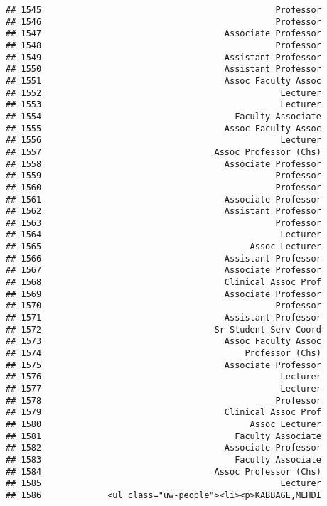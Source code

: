 \documentclass[
]{article}
\begin{document}
\begin{verbatim}
## 1545                                              Professor
## 1546                                              Professor
## 1547                                    Associate Professor
## 1548                                              Professor
## 1549                                    Assistant Professor
## 1550                                    Assistant Professor
## 1551                                    Assoc Faculty Assoc
## 1552                                               Lecturer
## 1553                                               Lecturer
## 1554                                      Faculty Associate
## 1555                                    Assoc Faculty Assoc
## 1556                                               Lecturer
## 1557                                  Assoc Professor (Chs)
## 1558                                    Associate Professor
## 1559                                              Professor
## 1560                                              Professor
## 1561                                    Associate Professor
## 1562                                    Assistant Professor
## 1563                                              Professor
## 1564                                               Lecturer
## 1565                                         Assoc Lecturer
## 1566                                    Assistant Professor
## 1567                                    Associate Professor
## 1568                                    Clinical Assoc Prof
## 1569                                    Associate Professor
## 1570                                              Professor
## 1571                                    Assistant Professor
## 1572                                  Sr Student Serv Coord
## 1573                                    Assoc Faculty Assoc
## 1574                                        Professor (Chs)
## 1575                                    Associate Professor
## 1576                                               Lecturer
## 1577                                               Lecturer
## 1578                                              Professor
## 1579                                    Clinical Assoc Prof
## 1580                                         Assoc Lecturer
## 1581                                      Faculty Associate
## 1582                                    Associate Professor
## 1583                                      Faculty Associate
## 1584                                  Assoc Professor (Chs)
## 1585                                               Lecturer
## 1586             <ul class="uw-people"><li><p>KABBAGE,MEHDI

\end{verbatim}
\end{document}
